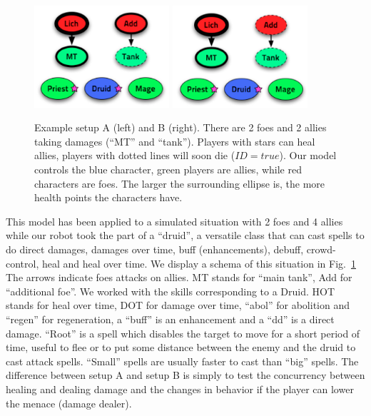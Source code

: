 \begin{figure}[h!]
\begin{center}
\includegraphics[width=5cm]{images/wow_fight1.png} \hspace{1.5cm} \includegraphics[width=5cm]{images/wow_fight2.png}
\caption{Example setup A (left) and B (right). There are 2 foes and 2 allies taking damages (``MT'' and ``tank''). Players with stars can heal allies, players with dotted lines will soon die ($ID=true$). Our model controls the blue character, green players are allies, while red characters are foes. The larger the surrounding ellipse is, the more health points the characters have.}
\label{fig:wow_fight}
\end{center}
\end{figure}

This model has been applied to a simulated situation with 2 foes and 4 allies while our robot took the part of a ``druid'', a versatile class that can cast spells to do direct damages, damages over time, buff (enhancements), debuff, crowd-control, heal and heal over time. We display a schema of this situation in Fig.~\ref{fig:wow_fight} The arrows indicate foes attacks on allies. MT stands for ``main tank'', Add for ``additional foe''. We worked with the skills corresponding to a Druid. HOT stands for heal over time, DOT for damage over time, ``abol'' for abolition and ``regen'' for regeneration, a ``buff'' is an enhancement and a ``dd'' is a direct damage. ``Root'' is a spell which disables the target to move for a short period of time, useful to flee or to put some distance between the enemy and the druid to cast attack spells. ``Small'' spells are usually faster to cast than ``big'' spells. The difference between setup A and setup B is simply to test the concurrency between healing and dealing damage and the changes in behavior if the player can lower the menace (damage dealer).

